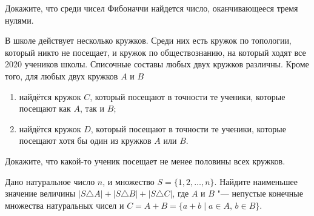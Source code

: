 \begin{problems}
\item Докажите, что среди чисел Фибоначчи найдется число, оканчивающееся тремя нулями.

\item В школе действует несколько кружков. Среди них есть кружок по топологии, который никто не посещает, и кружок по обществознанию, на который ходят все 2020 учеников школы. Списочные составы любых двух кружков различны. Кроме того, для любых двух кружков $A$ и $B$
\begin{enumerate}[label=\arabic*)]
  \item найдётся кружок $C$, который посещают в точности те ученики, которые посещают как $A$, так и $B$;
  \item найдётся кружок $D$, который посещают в точности те ученики, которые посещают хотя бы один из кружков $A$ или $B$.
\end{enumerate}
Докажите, что какой-то ученик посещает не менее половины всех кружков.

\item Дано натуральное число $n$, и множество $S=\{1,2,\ldots,n\}$. Найдите наименьшее значение величины $|S\triangle A|+|S\triangle B|+|S\triangle C|$, где $A$ и $B$ "--- непустые конечные множества натуральных чисел и $C=A+B=\{a+b \mid a\in A,\, b\in B\}$.

\end{problems}

